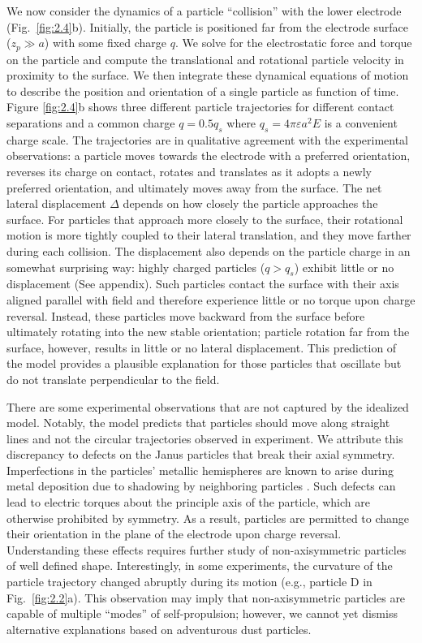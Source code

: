 We now consider the dynamics of a particle ``collision'' with the lower electrode (Fig.~\ref{fig:2.4}b). 
Initially, the particle is positioned far from the electrode surface ($z_p\gg a$) with some fixed charge $q$. 
We solve for the electrostatic force and torque on the particle and compute the translational and rotational particle velocity in proximity to the surface.
We then integrate these dynamical equations of motion to describe the position and orientation of a single particle as function of time.
Figure \ref{fig:2.4}b shows three different particle trajectories for different contact separations and a common charge $q = 0.5 q_s$ where $q_s = 4\pi\varepsilon a^2 E$ is a convenient charge scale.
The trajectories are in qualitative agreement with the experimental observations: a particle moves towards the electrode with a preferred orientation, reverses its charge on contact, rotates and translates as it adopts a newly preferred orientation, and ultimately moves away from the surface.
The net lateral displacement $\Delta$ depends on how closely the particle approaches the surface.
For particles that approach more closely to the surface, their rotational motion is more tightly coupled to their lateral translation, and they move farther during each collision.
The displacement also depends on the particle charge in an somewhat surprising way: highly charged particles ($q > q_s$) exhibit little or no displacement (See appendix).
Such particles contact the surface with their axis aligned parallel with field and therefore experience little or no torque upon charge reversal.
Instead, these particles move backward from the surface before ultimately rotating into the new stable orientation; particle rotation far from the surface, however, results in little or no lateral displacement.
This prediction of the model provides a plausible explanation for those particles that oscillate but do not translate perpendicular to the field.

There are some experimental observations that are not captured by the idealized model.
Notably, the model predicts that particles should move along straight lines and not the circular trajectories observed in experiment.
We attribute this discrepancy to defects on the Janus particles that break their axial symmetry.
Imperfections in the particles' metallic hemispheres are known to arise during metal deposition due to shadowing by neighboring particles \cite{Pawar2008}.
Such defects can lead to electric torques about the principle axis of the particle, which are otherwise prohibited by symmetry.
As a result, particles are permitted to change their orientation in the plane of the electrode upon charge reversal.
Understanding these effects requires further study of non-axisymmetric particles of well defined shape.
Interestingly, in some experiments, the curvature of the particle trajectory changed abruptly during its motion (e.g., particle D in Fig.~\ref{fig:2.2}a). 
This observation may imply that non-axisymmetric particles are capable of multiple ``modes'' of self-propulsion; however, we cannot yet dismiss alternative explanations based on adventurous dust particles.

